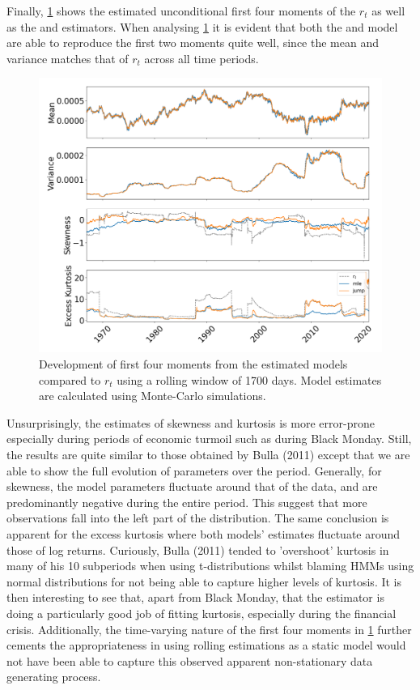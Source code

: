 Finally, \cref{fig:stylized_facts_rolling_moments} shows the estimated unconditional first four moments of the $r_t$ as well as the \jump and \mle estimators. When analysing \cref{fig:stylized_facts_rolling_moments} it is evident that both the \mle and \jump model are able to reproduce the first two moments quite well, since the mean and variance matches that of $r_t$ across all time periods.

\begin{figure}[H] 
    \centering
    \includegraphics[width=1.0\textwidth]{analysis/stylized_facts/images/moments_regular.png}
    \caption[Development of the first four moments from the estimated models and $r_t$]{Development of first four moments from the estimated models compared to $r_t$ using a rolling window of 1700 days. Model estimates are calculated using Monte-Carlo simulations.}
    \label{fig:stylized_facts_rolling_moments} 
\end{figure}

Unsurprisingly, the estimates of skewness and kurtosis is more error-prone especially during periods of economic turmoil such as during Black Monday. Still, the results are quite similar to those obtained by Bulla (2011) except that we are able to show the full evolution of parameters over the period. Generally, for skewness, the model parameters fluctuate around that of the data, and are predominantly negative during the entire period. This suggest that more observations fall into the left part of the distribution. The same conclusion is apparent for the excess kurtosis where both models' estimates fluctuate around those of log returns. Curiously, Bulla (2011) tended to 'overshoot' kurtosis in many of his 10 subperiods when using t-distributions whilst blaming HMMs using normal distributions for not being able to capture higher levels of kurtosis. It is then interesting to see that, apart from Black Monday, that the \jump estimator is doing a particularly good job of fitting kurtosis, especially during the financial crisis. Additionally, the time-varying nature of the first four moments in \cref{fig:stylized_facts_rolling_moments} further cements the appropriateness in using rolling estimations as a static model would not have been able to capture this observed apparent non-stationary data generating process.


